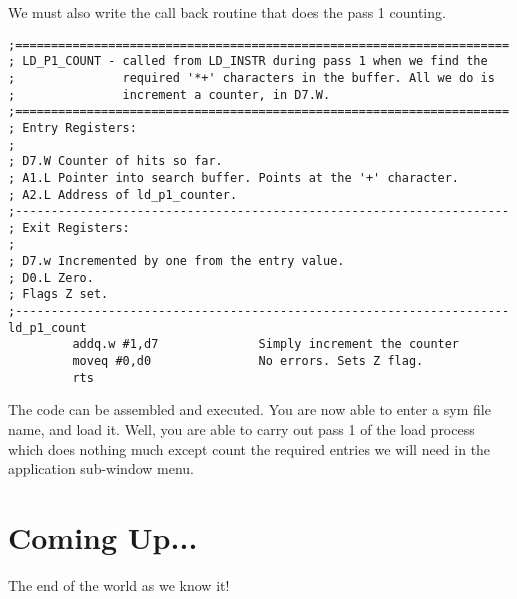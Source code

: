 We must also write the call back routine that does the pass 1
    counting.

\begin{lstlisting}[firstnumber=1,]
;=====================================================================
; LD_P1_COUNT - called from LD_INSTR during pass 1 when we find the 
;               required '*+' characters in the buffer. All we do is
;               increment a counter, in D7.W.
;=====================================================================
; Entry Registers:
;
; D7.W Counter of hits so far.
; A1.L Pointer into search buffer. Points at the '+' character.
; A2.L Address of ld_p1_counter.
;---------------------------------------------------------------------
; Exit Registers:
;
; D7.w Incremented by one from the entry value.
; D0.L Zero.
; Flags Z set.
;---------------------------------------------------------------------
ld_p1_count
         addq.w #1,d7              Simply increment the counter
         moveq #0,d0               No errors. Sets Z flag.
         rts
\end{lstlisting}

The code can be assembled and executed. You are now able to enter a
    sym file name, and load it. Well, you are able to carry out pass 1 of the
    load process which does nothing much except count the required entries we
    will need in the application sub-{}window menu.

\section{Coming Up...}
\label{ch33-the-end}%

The end of the world as we know it!

